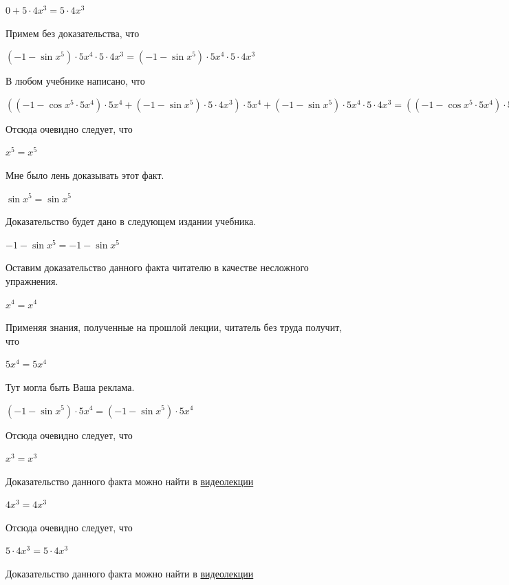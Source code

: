 \documentclass[12pt,a4paper,fleqn]{article}
\theoremstyle{definition}
\begin{document}
$ 0  +  5  \cdot  4 { x }^{ 3 } =  5  \cdot  4 { x }^{ 3 }$

Примем без доказательства, что 

$( -1  - \sin{ x }^{ 5 }) \cdot  5 { x }^{ 4 } \cdot  5  \cdot  4 { x }^{ 3 } = ( -1  - \sin{ x }^{ 5 }) \cdot  5 { x }^{ 4 } \cdot  5  \cdot  4 { x }^{ 3 }$

В любом учебнике написано, что 

$(( -1  - \cos{ x }^{ 5 } \cdot  5 { x }^{ 4 }) \cdot  5 { x }^{ 4 } + ( -1  - \sin{ x }^{ 5 }) \cdot  5  \cdot  4 { x }^{ 3 }) \cdot  5 { x }^{ 4 } + ( -1  - \sin{ x }^{ 5 }) \cdot  5 { x }^{ 4 } \cdot  5  \cdot  4 { x }^{ 3 } = (( -1  - \cos{ x }^{ 5 } \cdot  5 { x }^{ 4 }) \cdot  5 { x }^{ 4 } + ( -1  - \sin{ x }^{ 5 }) \cdot  5  \cdot  4 { x }^{ 3 }) \cdot  5 { x }^{ 4 } + ( -1  - \sin{ x }^{ 5 }) \cdot  5 { x }^{ 4 } \cdot  5  \cdot  4 { x }^{ 3 }$

Отсюда очевидно следует, что 

${ x }^{ 5 } = { x }^{ 5 }$

Мне было лень доказывать этот факт.

$\sin{ x }^{ 5 } = \sin{ x }^{ 5 }$

Доказательство будет дано в следующем издании учебника. 

$ -1  - \sin{ x }^{ 5 } =  -1  - \sin{ x }^{ 5 }$

Оставим доказательство данного факта читателю в качестве несложного упражнения. 

${ x }^{ 4 } = { x }^{ 4 }$

Применяя знания, полученные на прошлой лекции, читатель без труда получит, что 

$ 5 { x }^{ 4 } =  5 { x }^{ 4 }$

Тут могла быть Ваша реклама. 

$( -1  - \sin{ x }^{ 5 }) \cdot  5 { x }^{ 4 } = ( -1  - \sin{ x }^{ 5 }) \cdot  5 { x }^{ 4 }$

Отсюда очевидно следует, что 

${ x }^{ 3 } = { x }^{ 3 }$

Доказательство данного факта можно найти в \href{https://www.youtube.com/watch?v=dQw4w9WgXcQ}{видеолекции} 

$ 4 { x }^{ 3 } =  4 { x }^{ 3 }$

Отсюда очевидно следует, что 

$ 5  \cdot  4 { x }^{ 3 } =  5  \cdot  4 { x }^{ 3 }$

Доказательство данного факта можно найти в \href{https://www.youtube.com/watch?v=dQw4w9WgXcQ}{видеолекции} 
\end{document}
